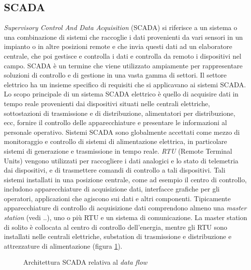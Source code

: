 \subsection{SCADA}
\emph{Supervisory Control And Data Acquisition} (SCADA) si riferisce a un sistema o una combinazione di sistemi che raccoglie i dati provenienti da vari sensori in un impianto o in altre posizioni remote e che invia questi dati ad un elaboratore centrale, che poi gestisce e controlla i dati e controlla da remoto i dispositivi nel campo. SCADA è un termine che viene utilizzato ampiamente per rappresentare soluzioni di controllo e di gestione in una vasta gamma di settori. Il settore elettrico ha un insieme specifico di requisiti che si applicavano ai sistemi SCADA. Lo scopo principale di un sistema SCADA elettrico è quello di acquisire dati in tempo reale provenienti dai dispositivi situati nelle centrali elettriche, sottostazioni di trasmissione e di distribuzione, alimentatori per distribuzione, ecc, fornire il controllo delle apparecchiature e presentare le informazioni al personale operativo.  
\newline
Sistemi SCADA sono globalmente accettati come mezzo di monitoraggio e controllo di sistemi di alimentazione elettrica, in particolare sistemi di generazione e trasmissione in tempo reale. \emph{RTU} (Remote Terminal Units) vengono utilizzati per raccogliere i dati analogici e lo stato di telemetria dai dispositivi, e di trasmettere comandi di controllo a tali dispositivi. Tali sistemi installati in una posizione centrale, come ad esempio il centro di controllo, includono apparecchiature di acquisizione dati, interfacce grafiche per gli operatori, applicazioni che agiscono sui dati e altri componenti. 
\newline
Tipicamente apparecchiature di controllo di acquisizione dati comprendono almeno una \emph{master station} (vedi ..), uno o più RTU e un sistema di comunicazione. La master station di solito è collocata al centro di controllo dell'energia, mentre gli RTU sono installati nelle centrali elettriche, substation di trasmissione e distribuzione e attrezzature di alimentazione (figura \ref{fig:24}).

\begin{figure}[h] 
\caption{Architettura SCADA relativa al \emph{data flow}}\label{fig:24}
\end{figure}


